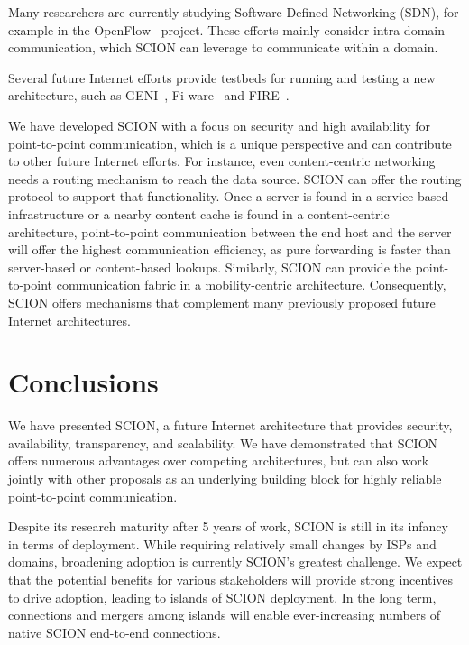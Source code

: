 \documentclass[a4paper]{llncs}
\newcommand\SCION{{\small\textsf{SCION}}\xspace}
\begin{document}
Many researchers are currently studying Software-Defined Networking (SDN), for
example in the OpenFlow~\cite{McKeown08Openflow,openflow-url} project. These
efforts mainly consider intra-domain communication, which \SCION can leverage
to communicate within a domain.

Several future Internet efforts provide testbeds for running and testing a new
architecture, such as GENI~\cite{geni-url}, Fi-ware~\cite{fi-ware-url} and
FIRE~\cite{fire-url}.

We have developed \SCION with a focus on security and high availability for
point-to-point communication, which is a unique perspective and can contribute
to other future Internet efforts. For instance, even content-centric networking
needs a routing mechanism to reach the data source. \SCION can offer the
routing protocol to support that functionality. Once a server is found in a
service-based infrastructure or a nearby content cache is found in a
content-centric architecture, point-to-point communication between the end host
and the server will offer the highest communication efficiency, as pure
forwarding is faster than server-based or content-based lookups. Similarly,
\SCION can provide the point-to-point communication fabric in a
mobility-centric architecture. Consequently, \SCION offers mechanisms that
complement many previously proposed future Internet architectures.

















 

\section{Conclusions}

We have presented \SCION, a future Internet architecture that provides security,
availability, transparency, and scalability. We have demonstrated that \SCION
offers numerous advantages over competing architectures, but can also work
jointly with other proposals as an underlying building block for highly reliable point-to-point
communication.

Despite its research maturity after 5 years of work, \SCION is still in its
infancy in terms of deployment. While requiring relatively small changes by
ISPs and domains, broadening adoption is currently \SCION{}'s greatest
challenge. We expect that the potential benefits for various stakeholders will
provide strong incentives to drive adoption, leading to islands of \SCION
deployment. In the long term, connections and mergers among islands will enable
ever-increasing numbers of native \SCION end-to-end connections.
\end{document}
